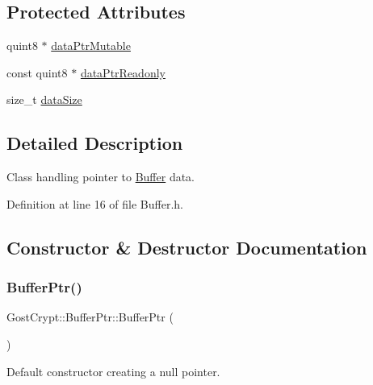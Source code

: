 \subsection*{Protected Attributes}
\begin{DoxyCompactItemize}
\item 
quint8 $\ast$ \hyperlink{class_gost_crypt_1_1_buffer_ptr_a705d4df0cd4a71f2bd1e7cb8c9199f4b}{data\+Ptr\+Mutable}
\item 
const quint8 $\ast$ \hyperlink{class_gost_crypt_1_1_buffer_ptr_a30b605a84eb010568c14aa42bdafe2d3}{data\+Ptr\+Readonly}
\item 
size\+\_\+t \hyperlink{class_gost_crypt_1_1_buffer_ptr_a63b4cbfd64f00015154f82a9376f5ca1}{data\+Size}
\end{DoxyCompactItemize}


\subsection{Detailed Description}
Class handling pointer to \hyperlink{class_gost_crypt_1_1_buffer}{Buffer} data. 

Definition at line 16 of file Buffer.\+h.



\subsection{Constructor \& Destructor Documentation}
\mbox{\label{class_gost_crypt_1_1_buffer_ptr_a40b0afec9bd544f8b70e34dfb7409307}} 
\subsubsection{\texorpdfstring{Buffer\+Ptr()}{BufferPtr()}\hspace{0.1cm}{\footnotesize\ttfamily [1/3]}}
{\footnotesize\ttfamily Gost\+Crypt\+::\+Buffer\+Ptr\+::\+Buffer\+Ptr (\begin{DoxyParamCaption}{ }\end{DoxyParamCaption})\hspace{0.3cm}{\ttfamily [inline]}}



Default constructor creating a null pointer. 



